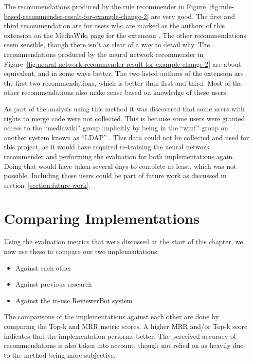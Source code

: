 The recommendations produced by the rule recommender in Figure~\ref{fig:rule-based-recommender-result-for-example-change-2} are very good. The first and third recommendation are for users who are marked as the authors of this extension on the MediaWiki page for the extension . The other recommendations seem sensible, though there isn't as clear of a way to detail why. The recommendations produced by the neural network recommender in Figure~\ref{fig:neural-network-recommender-result-for-example-change-2} are about equivalent, and in some ways better. The two listed authors of the extension are the first two recommendations, which is better than first and third. Most of the other recommendations also make sense based on knowledge of these users.

As part of the analysis using this method it was discovered that some users with rights to merge code were not collected. This is because some users were granted access to the ``mediawiki'' group implicitly by being in the ``wmf'' group on another system known as ``LDAP'' \citep{wikitech:ldap-wmf}. This data could not be collected and used for this project, as it would have required re-training the neural network recommender and performing the evaluation for both implementations again. Doing that would have taken several days to complete at least, which was not possible. Including these users could be part of future work as discussed in section~\ref{section:future-work}.

\section{Comparing Implementations\label{section:comparing-recommendations}}

Using the evaluation metrics that were discussed at the start of this chapter, we now use these to compare our two implementations:
\begin{itemize}
    \item Against each other
    \item Against previous research
    \item Against the in-use ReviewerBot system
\end{itemize}

The comparisons of the implementations against each other are done by comparing the Top-k and MRR metric scores. A higher MRR and/or Top-k score indicates that the implementation performs better. The perceived accuracy of recommendations is also taken into account, though not relied on as heavily due to the method being more subjective.

